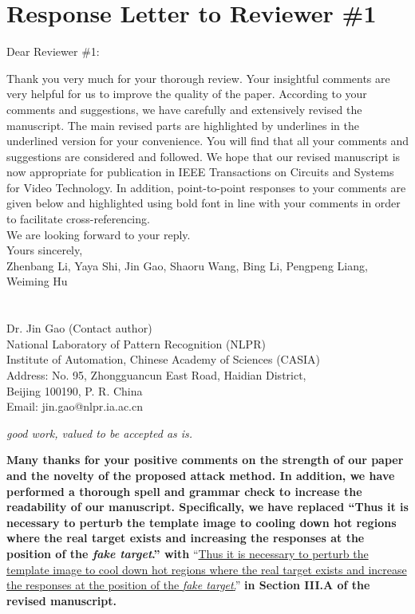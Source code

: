 \documentclass[12pt]{article}
\begin{document}
\newpage
{\centering\section*{Response Letter to Reviewer \#1}}
\noindent Dear Reviewer \#1:

Thank you very much for your thorough review. Your insightful comments are very helpful for us to improve the quality of the paper. According to your comments and suggestions, we have carefully and extensively revised the manuscript. The main revised parts are highlighted by underlines in the underlined version for your convenience. You will find that all your comments and suggestions are considered and followed. We hope that our revised manuscript is now appropriate for publication in IEEE Transactions on Circuits and Systems for Video Technology.
In addition, point-to-point responses to your comments are given below and highlighted using bold font in line with your comments in order to facilitate cross-referencing.\\[10pt]
\indent We are looking forward to your reply.\\[10pt]
\noindent Yours sincerely,\\
\noindent Zhenbang Li, Yaya Shi, Jin Gao, Shaoru Wang, Bing Li, Pengpeng Liang, Weiming Hu
\\
\\
\\
\noindent Dr. Jin Gao (Contact author)\\
\noindent National Laboratory of Pattern Recognition (NLPR)\\
\noindent Institute of Automation, Chinese Academy of Sciences (CASIA)\\
\noindent Address: No. 95, Zhongguancun East Road, Haidian District,\\
\noindent Beijing 100190, P. R. China\\
\noindent Email: jin.gao@nlpr.ia.ac.cn

\newpage
\textit{good work, valued to be accepted as is.}

\textbf{Many thanks for your positive comments on the strength of our paper and the novelty of the proposed attack method. In addition, we have performed a thorough spell and grammar check to increase the readability of our manuscript. Specifically, we have replaced ``Thus it is necessary to perturb the template image to cooling down hot regions where the real target exists and increasing the responses at the position of the \textit{fake target}.'' with} ``\uline{Thus it is necessary to perturb the template image to cool down hot regions where the real target exists and increase the responses at the position of the \textit{fake target}.}''
\textbf{in Section III.A of the revised manuscript.}
\end{document}
